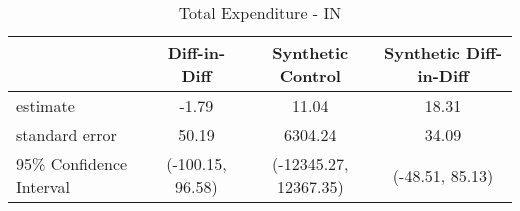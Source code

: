 \begin{table}[ht]
\centering
\begin{tabular}{lccc}
  \hline
 & Diff-in-Diff & Synthetic Control & Synthetic Diff-in-Diff \\ 
  \hline
estimate & -1.79 & 11.04 & 18.31 \\ 
  standard error & 50.19 & 6304.24 & 34.09 \\ 
  95\% Confidence Interval & (-100.15, 96.58) & (-12345.27, 12367.35) & (-48.51, 85.13) \\ 
   \hline
\end{tabular}
\caption{Total Expenditure - IN} 
\end{table}

